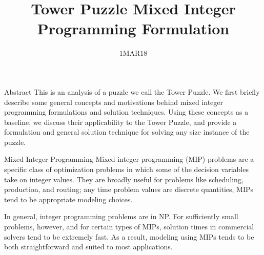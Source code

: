 \documentclass[12pt]{article}
\begin{document}
 
 
\title{Tower Puzzle Mixed Integer Programming Formulation}
\date{1MAR18}
\maketitle
 
\begin{section}{Abstract}
This is an analysis of a puzzle we call the Tower Puzzle. We first briefly describe some general concepts and motivations behind mixed integer programming formulations and solution techniques. Using these concepts as a baseline, we discuss their applicability to the Tower Puzzle, and provide a formulation and general solution technique for solving any size instance of the puzzle.
\end{section}
 
\begin{section}{Mixed Integer Programming}
Mixed integer programming (MIP) problems are a specific class of optimization problems in which some of the decision variables take on integer values. They are broadly useful for problems like scheduling, production, and routing; any time problem values are discrete quantities, MIPs tend to be appropriate modeling choices.

In general, integer programming problems are in NP. For sufficiently small problems, however, and for certain types of MIPs, solution times in commercial solvers tend to be extremely fast. As a result, modeling using MIPs tends to be both straightforward and suited to most applications.
\end{section}
\end{document}
